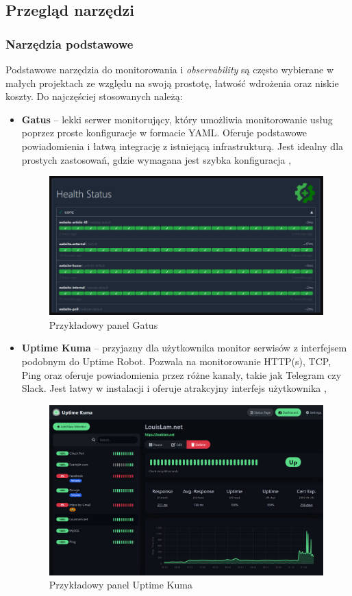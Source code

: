 \documentclass{article}
\begin{document}
\subsection{Przegląd narzędzi}

\subsubsection{Narzędzia podstawowe}

Podstawowe narzędzia do monitorowania i \textit{observability} są często wybierane w małych projektach ze względu na swoją prostotę, łatwość wdrożenia oraz niskie koszty. Do najczęściej stosowanych należą:

\begin{itemize}
    \item \textbf{Gatus} – lekki serwer monitorujący, który umożliwia monitorowanie usług poprzez proste konfiguracje w formacie YAML. Oferuje podstawowe powiadomienia i łatwą integrację z istniejącą infrastrukturą. Jest idealny dla prostych zastosowań, gdzie wymagana jest szybka konfiguracja \cite{GatusGithub},

\begin{figure}[H]
    \centering
    \includegraphics[width=0.5\linewidth]{przykladGatus.png}
    \caption{Przykładowy panel Gatus}
    \label{fig:enter-label}
\end{figure}

    \item \textbf{Uptime Kuma} – przyjazny dla użytkownika monitor serwisów z interfejsem podobnym do Uptime Robot. Pozwala na monitorowanie HTTP(s), TCP, Ping oraz oferuje powiadomienia przez różne kanały, takie jak Telegram czy Slack. Jest łatwy w instalacji i oferuje atrakcyjny interfejs użytkownika \cite{UptimeKumaGithub},

\begin{figure}[H]
    \centering
    \includegraphics[width=0.5\linewidth]{przykladKuma.png}
    \caption{Przykładowy panel Uptime Kuma}
    \label{fig:enter-label}
\end{figure}


\end{itemize}
\end{document}
